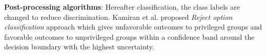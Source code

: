 \item \textbf{Post-processing algorithms}: Hereafter classification, the class labels are changed to reduce discrimination. Kamiran et al. proposed \textit{Reject option classification} approach \cite{Kamiran:2018:ERO:3165328.3165686} which gives unfavorable outcomes to privileged groups and favorable outcomes to unprivileged groups within a confidence band around the decision boundary with the highest uncertainty.

\ei



